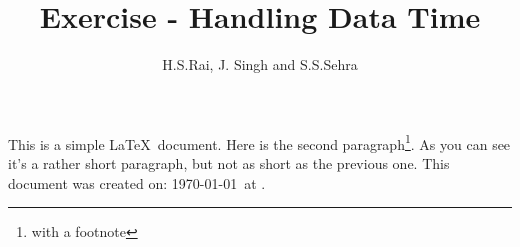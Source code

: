 \documentclass[12pt]{article}
\author{H.S.Rai, J. Singh and S.S.Sehra}
\title{Exercise - Handling Data Time}
\begin{document}
\maketitle

This is a simple \LaTeX\ document.
Here is the second paragraph\footnote{with a footnote}. 
As you can see it's a rather short paragraph, but not 
as short as the previous one. This document was 
created on: \today\ at \currenttime.
\end{document}
